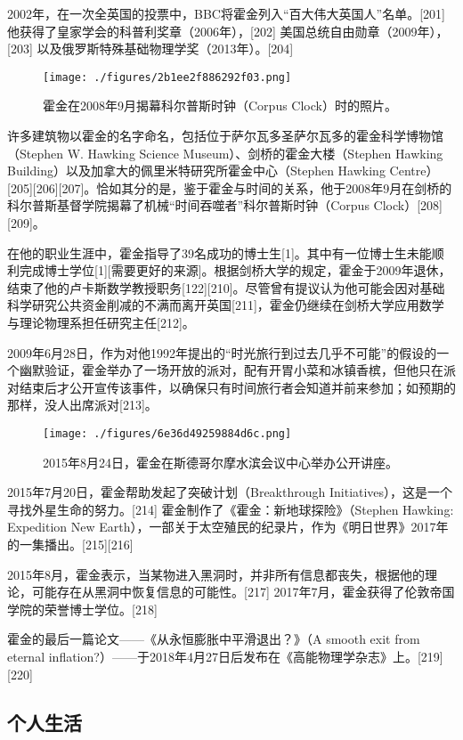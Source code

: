 2002年，在一次全英国的投票中，BBC将霍金列入“百大伟大英国人”名单。[201] 他获得了皇家学会的科普利奖章（2006年），[202] 美国总统自由勋章（2009年），[203] 以及俄罗斯特殊基础物理学奖（2013年）。[204]
\begin{figure}[ht]
\centering
\texttt{[image: ./figures/2b1ee2f886292f03.png]}
\caption{霍金在2008年9月揭幕科尔普斯时钟（Corpus Clock）时的照片。} \label{fig_HJ_5}
\end{figure}
许多建筑物以霍金的名字命名，包括位于萨尔瓦多圣萨尔瓦多的霍金科学博物馆（Stephen W. Hawking Science Museum）、剑桥的霍金大楼（Stephen Hawking Building）以及加拿大的佩里米特研究所霍金中心（Stephen Hawking Centre）[205][206][207]。恰如其分的是，鉴于霍金与时间的关系，他于2008年9月在剑桥的科尔普斯基督学院揭幕了机械“时间吞噬者”科尔普斯时钟（Corpus Clock）[208][209]。

在他的职业生涯中，霍金指导了39名成功的博士生[1]。其中有一位博士生未能顺利完成博士学位[1][需要更好的来源]。根据剑桥大学的规定，霍金于2009年退休，结束了他的卢卡斯数学教授职务[122][210]。尽管曾有提议认为他可能会因对基础科学研究公共资金削减的不满而离开英国[211]，霍金仍继续在剑桥大学应用数学与理论物理系担任研究主任[212]。

2009年6月28日，作为对他1992年提出的“时光旅行到过去几乎不可能”的假设的一个幽默验证，霍金举办了一场开放的派对，配有开胃小菜和冰镇香槟，但他只在派对结束后才公开宣传该事件，以确保只有时间旅行者会知道并前来参加；如预期的那样，没人出席派对[213]。

\begin{figure}[ht]
\centering
\texttt{[image: ./figures/6e36d49259884d6c.png]}
\caption{2015年8月24日，霍金在斯德哥尔摩水滨会议中心举办公开讲座。} \label{fig_HJ_6}
\end{figure}
2015年7月20日，霍金帮助发起了突破计划（Breakthrough Initiatives），这是一个寻找外星生命的努力。[214] 霍金制作了《霍金：新地球探险》（Stephen Hawking: Expedition New Earth），一部关于太空殖民的纪录片，作为《明日世界》2017年的一集播出。[215][216]

2015年8月，霍金表示，当某物进入黑洞时，并非所有信息都丧失，根据他的理论，可能存在从黑洞中恢复信息的可能性。[217] 2017年7月，霍金获得了伦敦帝国学院的荣誉博士学位。[218]

霍金的最后一篇论文——《从永恒膨胀中平滑退出？》（A smooth exit from eternal inflation?）——于2018年4月27日后发布在《高能物理学杂志》上。[219][220]
\subsection{个人生活}
